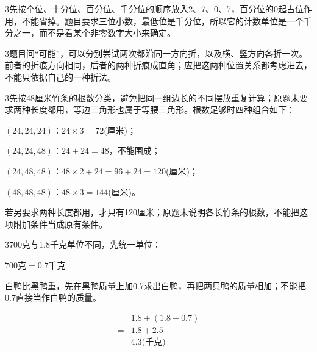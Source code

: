 \documentclass[multi=snippet,border={5bp 20bp 5bp 5bp}]{standalone}
\newenvironment{snippet}[3]{\begin{minipage}{#1bp}\color{answerred}\fontsize{#2}{#3}\selectfont\raggedright}{\end{minipage}}
\begin{document}
\begin{snippet}{505}{11.5}{14}\begin{multicols}{3}\raggedcolumns 先按个位、十分位、百分位、千分位的顺序放入2、7、0、7，百分位的0起占位作用，不能省掉。题目要求三位小数，最低位是千分位，所以它的计数单位是一个千分之一，而不是看某个非零数字大小来确定。\end{multicols}\end{snippet}
\begin{snippet}{505}{11.5}{14}\begin{multicols}{3}\raggedcolumns 题目问“可能”，可以分别尝试两次都沿同一方向折，以及横、竖方向各折一次。前者的折痕方向相同，后者的两种折痕成直角；应把这两种位置关系都考虑进去，不能只依据自己的一种折法。\end{multicols}\end{snippet}
\begin{snippet}{505}{11.5}{14}\begin{multicols}{3}\raggedcolumns 先按48厘米竹条的根数分类，避免把同一组边长的不同摆放重复计算；原题未要求两种长度都用，等边三角形也属于等腰三角形。根数足够时四种组合如下：\par \((24,\allowbreak 24,\allowbreak 24)\)\allowbreak ：\(24\times3=72\)\allowbreak (厘米)；\par \((24,\allowbreak 24,\allowbreak 48)\)\allowbreak ：\(24+24=48\)\allowbreak ，不能围成；\par \((24,\allowbreak 48,\allowbreak 48)\)\allowbreak ：\(48\times2+24=96+24=120\)\allowbreak (厘米)；\par \((48,\allowbreak 48,\allowbreak 48)\)\allowbreak ：\(48\times3=144\)\allowbreak (厘米)。\par 若另要求两种长度都用，才只有120厘米；原题未说明各长竹条的根数，不能把这项附加条件当成原有条件。\end{multicols}\end{snippet}
\begin{snippet}{505}{11.5}{14}\begin{multicols}{3}\raggedcolumns 700克与1.8千克单位不同，先统一单位：\par\noindent\(\displaystyle 700\text{克}=0.7\text{千克}\)\allowbreak \par 白鸭比黑鸭重，先在黑鸭质量上加0.7求出白鸭，再把两只鸭的质量相加；不能把0.7直接当作白鸭的质量。\par \noindent\[\displaystyle \begin{aligned}&1.8+(1.8+0.7)\\={}&1.8+2.5\\={}&4.3\text{(千克)}\end{aligned}\]\par\end{multicols}\end{snippet}
\end{document}
